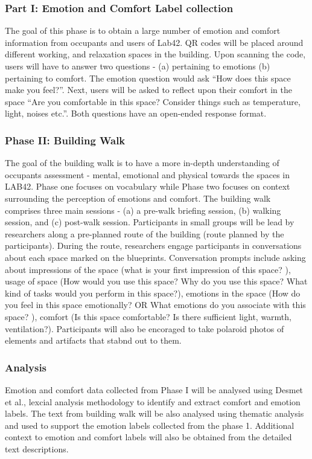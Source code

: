 \documentclass[acmconf, anonymous, review]{acmart}
\begin{document}
\subsubsection{Part I: Emotion and Comfort Label collection}
The goal of this phase is to obtain a large number of emotion and comfort information from occupants and users of Lab42. QR codes will be placed around different working, and relaxation spaces in the building. Upon scanning the code, users will have to answer two questions - (a) pertaining to emotions (b) pertaining to comfort. The emotion question would ask “How does this space make you feel?”. Next, users will be asked to reflect upon their comfort in the space “Are you comfortable in this space? Consider things such as temperature, light, noises etc.”. Both questions have an open-ended response format.

\subsubsection{Phase II: Building Walk}
The goal of the building walk is to have a more in-depth understanding of occupants assessment - mental, emotional and physical towards the spaces in LAB42. Phase one focuses on vocabulary while Phase two focuses on context surrounding the perception of emotions and comfort. The building walk comprises three main sessions - (a) a pre-walk briefing session, (b) walking session, and (c) post-walk session. Participants in small groups will be lead by researchers along a pre-planned route of the building (route planned by the participants). During the route, researchers engage participants in conversations about each space marked on the blueprints. Conversation  prompts include asking about impressions of the space (what is your first impression of this space? ), usage of space (How would you use this space? Why do you use this space? What kind of tasks would you perform in this space?), emotions in the space (How do you feel in this space emotionally? OR What emotions do you associate with this space? ), comfort (Is this space comfortable?	Is there sufficient light, warmth, ventilation?). Participants will also be encoraged to take polaroid photos of elements and artifacts that stabnd out to them. 

\subsubsection{Analysis}
Emotion and comfort data collected from Phase I will be analysed using Desmet et al., lexcial analysis methodology to identify and extract comfort and emotion labels. The text from building walk will be also analysed using thematic analysis and used to support the emotion labels collected from the phase 1. Additional context to emotion and comfort labels will also be obtained from the detailed text descriptions.
\end{document}
